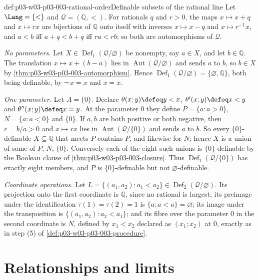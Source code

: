 \begin{hbexample}{def:p03-w03-p03-003-rational-order}{Definable subsets of the rational line}
Let \(\Lang=\{<\}\) and \(\mathcal Q=(\mathbb Q,<)\).  For rationals \(q\)
and \(r>0\), the maps \(x\mapsto x+q\) and \(x\mapsto rx\) are bijections of
\(\mathbb Q\) onto itself with inverses \(x\mapsto x-q\) and
\(x\mapsto r^{-1}x\), and \(a<b\) iff \(a+q<b+q\) iff \(ra<rb\); so both are
automorphisms of \(\mathcal Q\).

\emph{No parameters.}  Let \(X\in\operatorname{Def}_1(\mathcal Q/\varnothing)\)
be nonempty, say \(a\in X\), and let \(b\in\mathbb Q\).  The translation
\(x\mapsto x+(b-a)\) lies in \(\operatorname{Aut}(\mathcal Q/\varnothing)\)
and sends \(a\) to \(b\), so \(b\in X\) by
\cref{thm:p03-w03-p03-003-automorphism}.  Hence
\(\operatorname{Def}_1(\mathcal Q/\varnothing)=\{\varnothing,\mathbb Q\}\),
both being definable, by \(\neg\,x=x\) and \(x=x\).

\emph{One parameter.}  Let \(A=\{0\}\).  Declare \(\theta(x;y)\defeq y<x\),
\(\theta'(x;y)\defeq x<y\) and \(\theta''(x;y)\defeq x=y\).  At the parameter
\(0\) they define \(P=\{a:a>0\}\), \(N=\{a:a<0\}\) and \(\{0\}\).  If
\(a,b\) are both positive or both negative, then \(r=b/a>0\) and
\(x\mapsto rx\) lies in \(\operatorname{Aut}(\mathcal Q/\{0\})\) and sends
\(a\) to \(b\).  So every \(\{0\}\)-definable \(X\subseteq\mathbb Q\) that
meets \(P\) contains \(P\), and likewise for \(N\); hence \(X\) is a union of
some of \(P\), \(N\), \(\{0\}\).  Conversely each of the eight such unions is
\(\{0\}\)-definable by the Boolean clause of
\cref{thm:p03-w03-p03-003-closure}.  Thus
\(\operatorname{Def}_1(\mathcal Q/\{0\})\) has exactly eight members, and
\(P\) is \(\{0\}\)-definable but not \(\varnothing\)-definable.

\emph{Coordinate operations.}  Let
\(L=\{(a_1,a_2):a_1<a_2\}\in\operatorname{Def}_2(\mathcal Q/\varnothing)\).
Its projection onto the first coordinate is \(\mathbb Q\), since no rational
is largest; its preimage under the identification
\(\tau(1)=\tau(2)=1\) is \(\{a:a<a\}=\varnothing\); its image under the
transposition is \(\{(a_1,a_2):a_2<a_1\}\); and its fibre over the parameter
\(0\) in the second coordinate is \(N\), defined by \(x_1<x_2\) declared as
\((x_1;x_2)\) at \(0\), exactly as in step (5) of
\cref{def:p03-w03-p03-003-procedure}.
\end{hbexample}

\section{Relationships and limits}
\label{sec:p03-w03-p03-003-relationships}

